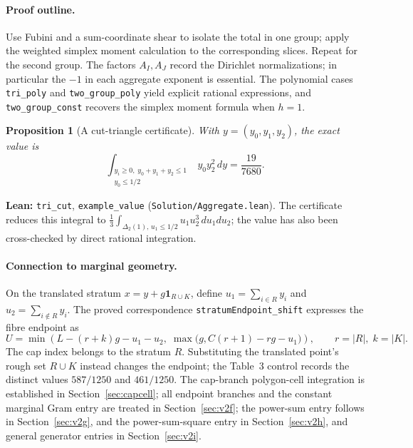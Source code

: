 \documentclass[11pt]{article}
\newtheorem{proposition}[theorem]{Proposition}
\newcommand{\code}[1]{\texttt{#1}}
\begin{document}
\paragraph{Proof outline.}
Use Fubini and a sum-coordinate shear to isolate the total in one group;
apply the weighted simplex moment calculation to the corresponding slices.
Repeat for the second group. The factors $A_I,A_J$ record the Dirichlet
normalizations; in particular the $-1$ in each aggregate exponent is essential.
The polynomial cases \code{tri\_poly} and \code{two\_group\_poly} yield
explicit rational expressions, and \code{two\_group\_const} recovers the
simplex moment formula when $h=1$.

\begin{proposition}[A cut-triangle certificate]\label{prop:aggregate-example}
With $y=(y_0,y_1,y_2)$, the exact value is
\[
 \int_{\substack{y_i\ge0,\;y_0+y_1+y_2\le1\\y_0\le 1/2}}
 y_0y_2^2\,dy=\frac{19}{7680}.
\]
\end{proposition}
\noindent\textbf{Lean:} \code{tri\_cut}, \code{example\_value}
(\nolinkurl{Solution/Aggregate.lean}). The certificate reduces this integral
to $\tfrac13\int_{\Delta_2(1),\,u_1\le1/2}u_1u_2^3\,du_1du_2$;
the value has also been cross-checked by direct rational integration.

\paragraph{Connection to marginal geometry.}
On the translated stratum $x=y+g\mathbf 1_{R\cup K}$, define
$u_1=\sum_{i\in R}y_i$ and $u_2=\sum_{i\notin R}y_i$.
The proved correspondence \code{stratumEndpoint\_shift} expresses the
fibre endpoint as
\[
 U=\min\!\left(L-(r+k)g-u_1-u_2,\;
 \max\bigl(g,C(r+1)-rg-u_1\bigr)\right),
 \qquad r=|R|,\;k=|K|.
\]
The cap index belongs to the stratum $R$. Substituting the translated point's
rough set $R\cup K$ instead changes the endpoint; the Table~3 control records
the distinct values $587/1250$ and $461/1250$.
The cap-branch polygon-cell integration is established in Section~\ref{sec:capcell}; all endpoint branches and the constant marginal Gram entry are treated in Section~\ref{sec:v2f}; the power-sum entry follows in Section~\ref{sec:v2g}, and the power-sum-square entry in Section~\ref{sec:v2h}, and general generator entries in Section~\ref{sec:v2i}.
\end{document}
